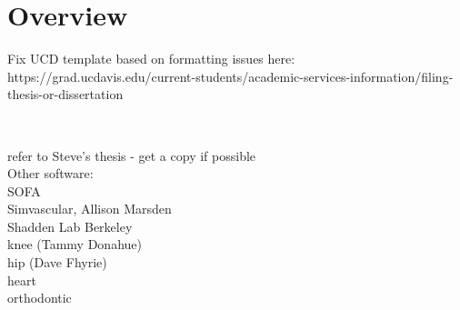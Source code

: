 \chapter{Overview}
%

Fix UCD template based on formatting issues here: https://grad.ucdavis.edu/current-students/academic-services-information/filing-thesis-or-dissertation

~\cite{heartmech}~\cite{newheartpaper}~\cite{vorocrust1,vorocrust2,simpleware,persson}

refer to Steve's thesis - get a copy if possible \\
Other software:\\
SOFA\\
Simvascular, Allison Marsden\\
Shadden Lab Berkeley\\
knee (Tammy Donahue) \\
hip (Dave Fhyrie) \\
heart \\
orthodontic \\